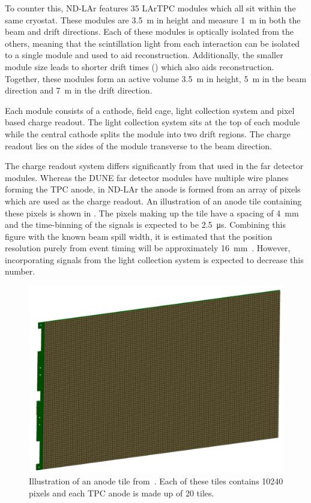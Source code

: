 To counter this, ND-LAr features 35 LArTPC modules which all sit within the same cryostat.
These modules are \SI{3.5}{\metre} in height and measure \SI{1}{\metre} in both the beam and drift directions.
Each of these modules is optically isolated from the others, meaning that the scintillation light from each interaction can be isolated to a single module and used to aid reconstruction.
Additionally, the smaller module size leads to shorter drift times () which also aids reconstruction.
Together, these modules form an active volume \SI{3.5}{\metre} in height, \SI{5}{\metre} in the beam direction and \SI{7}{\metre} in the drift direction.

Each module consists of a cathode, field cage, light collection system and pixel based charge readout.
The light collection system sits at the top of each module while the central cathode splits the module into two drift regions.
The charge readout lies on the sides of the module transverse to the beam direction.

The charge readout system differs significantly from that used in the far detector modules.
Whereas the DUNE far detector modules have multiple wire planes forming the TPC anode, in ND-LAr the anode is formed from an array of pixels which are used as the charge readout.
An illustration of an anode tile containing these pixels is shown in .
The pixels making up the tile have a spacing of \SI{4}{\milli\metre} and the time-binning of the signals is expected to be \SI{2.5}{\micro\second}.
Combining this figure with the known beam spill width, it is estimated that the position resolution purely from event timing will be approximately \SI{16}{\milli\metre}~\cite{ndCdr}.
However, incorporating signals from the light collection system is expected to decrease this number.

\begin{figure}[h]
  \centering
  \includegraphics[width=.7\linewidth]{files/figures/dune_detector/larpix}
  \caption[LArPix anode tile]{Illustration of an anode tile from~\cite{ndCdr}. Each of these tiles contains \num{10240} pixels and each TPC anode is made up of 20 tiles.}
  \label{fig:larpix}
\end{figure}

